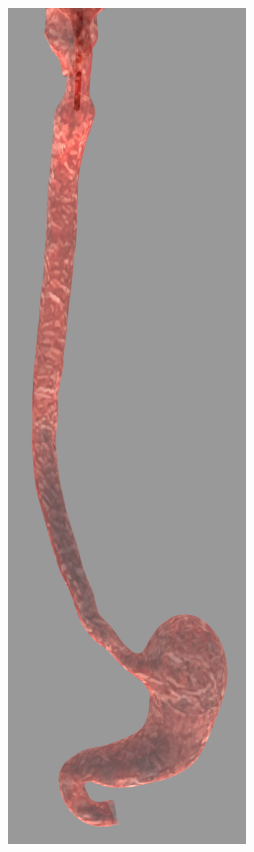 \documentclass[12pt,a4]{article}
\begin{document}
\begin{figure}[ht!]
\begin{subfigure}{0.15\textwidth}
        \includegraphics[width=0.6\linewidth]{figures/GIsnaps/1.png}
   

\end{subfigure}
\end{figure}
\end{document}
